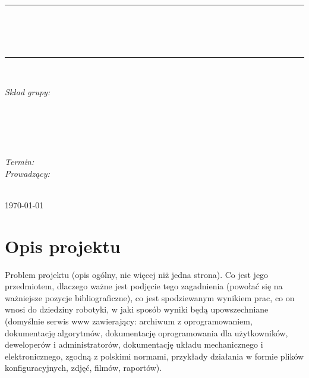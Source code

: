 \documentclass[10pt, a4paper]{article}
\begin{document}
\def\tablename{Tabela}	%

\begin{titlepage}
	\begin{center}
		\textsc{\LARGE \formakursu}\\[1cm]		
		\textsc{\Large \kurs}\\[0.5cm]		
		\rule{\textwidth}{0.08cm}\\[0.4cm]
		{\huge \bfseries \doctype}\\[1cm]
		{\huge \bfseries \projectname}\\[0.5cm]
		\rule{\textwidth}{0.08cm}\\[1cm]
		
		\begin{flushright} \large
		\emph{Skład grupy:}\\
		\osobaA\\
		\osobaB\\
		\osobaC\\
		\osobaD\\
		\osobaE\\[0.4cm]
		
		\emph{Termin: }\termin\\[0.4cm]

		\emph{Prowadzący:} \\
		\prowadzacy \\
		
		\end{flushright}
		
		\vfill
		
		{\large \today}
	\end{center}	
\end{titlepage}

\newpage
\tableofcontents
\newpage

\section{Opis projektu}
\label{sec:OpisProjektu}

Problem projektu (opis ogólny, nie więcej niż jedna strona). Co jest jego przedmiotem, dlaczego ważne jest podjęcie tego zagadnienia (powołać się na ważniejsze pozycje bibliograficzne), co jest spodziewanym wynikiem prac, co on wnosi do dziedziny robotyki, w jaki sposób wyniki będą upowszechniane (domyślnie serwis www zawierający: archiwum z oprogramowaniem, dokumentację algorytmów, dokumentację oprogramowania dla użytkowników, deweloperów i administratorów, dokumentację układu mechanicznego i elektronicznego, zgodną z polskimi normami, przykłady działania w formie plików konfiguracyjnych, zdjęć, filmów, raportów).
\end{document}
